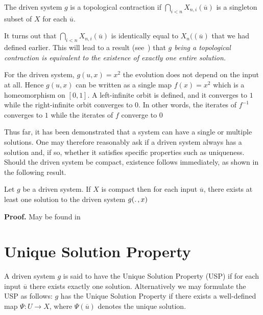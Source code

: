 \begin{Definition}
  \label{Dfn_topContr}\rm
  The driven system $g$ is a topological contraction if $\bigcap_{i<n}X_{n,i}(\overline{u})$ is a singleton subset of $X$ for each $\overline{u}$. 
\end{Definition}

It turns out that $\bigcap_{i<n}X_{n,i}(\overline{u})$ is identically equal to $X_n((\overline{u})$ that we had defined earlier. This will lead to a result (see~\cite{manjunath2013echo}) that 
\textit{$g$ being a topological contraction is equivalent to the existence of exactly one entire solution.}

\begin{Remark}
  \label{rem_proofEx} \rm
  For the driven system,  
  $g(u,x)=x^2$ the evolution does not depend on the input at all. Hence $g(u,x)$ can be written as a single map $f(x)=x^2$ which is a homeomorphism on $[0,1]$. 
  A left-infinite orbit is defined, and it converges to $1$ while the right-infinite orbit converges to $0$. 
  In other words, the iterates of $f^{-1}$ converges to $1$ while the iterates of $f$ converge to $0$ 
\end{Remark}

Thus far, it has been demonstrated that a system can have a single or multiple solutions. One may therefore reasonably ask if a driven system always has a solution and, if so, whether it satisfies specific properties such as uniqueness. 
Should the driven system be compact, existence follows immediately, as shown in the following result.

\begin{Theorem}\label{Thm_CompactExistence}
 Let $g$ be a driven system.  If $X$ is compact then for each input $\overline{u}$, there exists at least one solution to the driven system $g(\ldotp, x)$
\end{Theorem}
\vspace{-6mm}
{\bf Proof.} May be found in~\cite{kloeden2011nonautonomous, manjunath2014dynamics, manjunath2013echo}


\section{Unique Solution Property}

\begin{Definition}
  \label{Dfn_usp}\rm
  A driven system $g$ is said to have the Unique Solution Property (USP) if for each input $\overline{u}$ there exists exactly one solution. 
  Alternatively we may formulate the USP as follows: $g$ has the Unique Solution Property if there exists a well-defined map $\Psi:{U}\to{X}$, where $\Psi({\overline{u}})$ denotes the unique solution.
\end{Definition}

